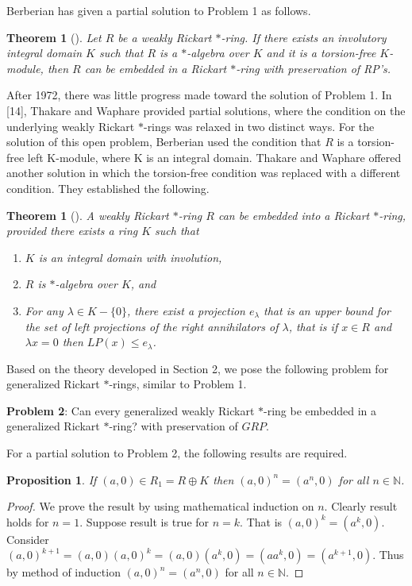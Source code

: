\documentclass[11pt, one side,emlines]{amsart}
\newtheorem{theorem}[lemma]{Theorem}
\newtheorem{proposition}[lemma]{Proposition}
\theoremstyle{definition}
\numberwithin{equation}{section} \thispagestyle{empty} \voffset
\begin{document}
  Berberian has given a partial solution to Problem 1 as follows.
\begin{theorem}[{\cite[Theorem 1, page 31]{Ber}}] \label{Th1}
	Let $R$ be a weakly Rickart $*$-ring. If there exists an involutory integral domain $K$ such that $R$ is a $*$-algebra over $K$  and it is a torsion-free $K$-module, then $R$ can be embedded in a Rickart $*$-ring with preservation of RP's. 
\end{theorem} 
After 1972, there was little progress made toward the solution of Problem 1. In [14], Thakare and Waphare provided partial solutions, where the condition on the underlying weakly Rickart $*$-rings was relaxed in two distinct ways. For the solution of this open problem, Berberian used the condition that $R$ is a torsion-free left K-module, where K is an integral domain. Thakare and Waphare offered another solution in which the torsion-free condition was replaced with a different condition. They established the following.




\begin{theorem}[{\cite[Theorem 2]{Tha3}}] \label{Th2}
	A weakly Rickart $*$-ring $R$ can be embedded into a Rickart $*$-ring, provided there exists a ring $K$ such that
	\begin{enumerate}
\item $K$ is an integral domain with involution,
	\item  $R$ is $*$-algebra over $K$, and
	\item  For any $\lambda \in K-\{0\}$, there exist a projection $e_\lambda$ that is an upper bound for the set of left projections of the right annihilators of $\lambda$, that is if $x\in R$ and $\lambda x=0$ then $LP(x)\leq e_\lambda$.
		\end{enumerate}
\end{theorem}

  Based on the theory developed in Section 2, we pose the following problem for generalized Rickart $*$-rings, similar to Problem 1.
   
{\bf Problem 2}: Can every generalized weakly Rickart $*$-ring be embedded in a generalized Rickart $*$-ring? with preservation of $GRP$.

For a partial solution to Problem 2, the following results are required.

\begin{proposition} If $(a,0)\in  R_1 = R\oplus K$ then $(a,0)^n=(a^n ,0)$ for all  $n\in\mathbb N$.
\end{proposition}
\begin{proof} We prove the result by using mathematical induction on $n$. 
	Clearly result holds for $n=1$. Suppose result is true for $n=k$.
	That is $(a,0)^k = (a^k,0) $.
	Consider $(a,0)^{k+1}=(a,0)(a,0)^k=(a,0)(a^k,0)=(aa^k,0)=(a^{k+1},0)$.
	Thus by method of induction $(a,0)^n=(a^n,0)$ for all $n\in\mathbb N$. 
\end{proof}
\end{document}
